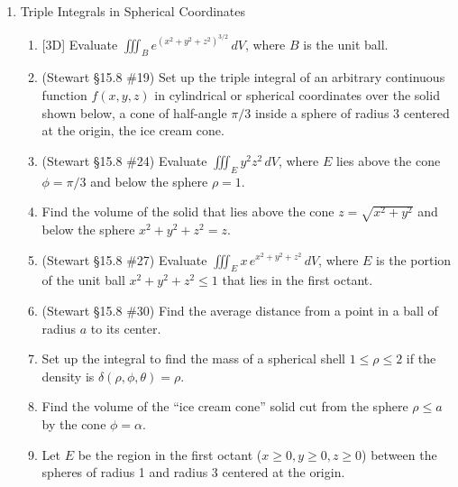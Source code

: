 \documentclass[12pt]{article}
\newcommand{\dimtag}[1]{{\footnotesize\textsc{[#1]}}\;}
\begin{document}
\begin{enumerate}
\item Triple Integrals in Spherical Coordinates
    \begin{enumerate}
        \item \dimtag{3D} Evaluate $\iiint_{B} e^{(x^2+y^2+z^2)^{3/2}} \, dV$, where $B$ is the unit ball.
        \item (Stewart \S15.8 \#19) Set up the triple integral of an arbitrary continuous function $f(x,y,z)$ in cylindrical or spherical coordinates over the solid shown below, a cone of half-angle $\pi/3$ inside a sphere of radius $3$ centered at the origin, the ice cream cone.
        \begin{center}
        \end{center}
        \item (Stewart \S15.8 \#24) Evaluate $\iiint_E y^2 z^2\, dV$, where $E$ lies above the cone $\phi = \pi/3$ and below the sphere $\rho = 1$.
        \item Find the volume of the solid that lies above the cone $z = \sqrt{x^2 + y^2}$ and below the sphere $x^2 + y^2 + z^2 = z$.
        \item (Stewart \S15.8 \#27) Evaluate $\iiint_E x\,e^{x^2 + y^2 + z^2}\, dV$, where $E$ is the portion of the unit ball $x^2+y^2+z^2 \leq 1$ that lies in the first octant.
        \item (Stewart \S15.8 \#30) Find the average distance from a point in a ball of radius $a$ to its center.
        \item Set up the integral to find the mass of a spherical shell $1 \le \rho \le 2$ if the density is $\delta(\rho, \phi, \theta) = \rho$.
        \item Find the volume of the ``ice cream cone'' solid cut from the sphere $\rho \le a$ by the cone $\phi = \alpha$.
        \item Let $E$ be the region in the first octant ($x \geq 0, y \geq 0, z \geq 0$) between the spheres of radius 1 and radius 3 centered at the origin.

\end{enumerate}
\end{enumerate}
\end{document}
